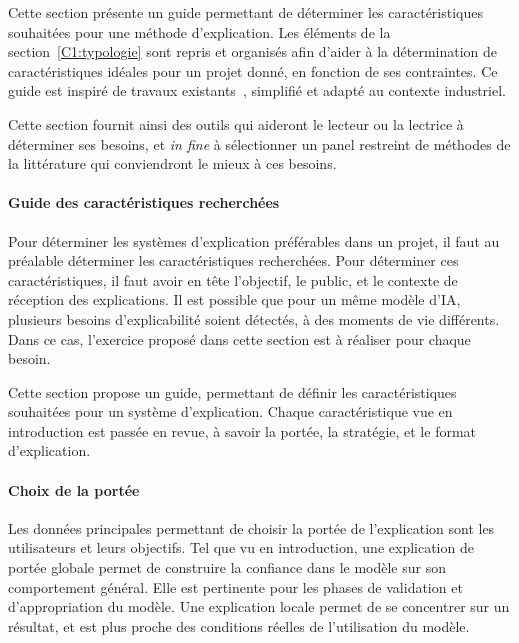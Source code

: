 Cette section présente un guide permettant de déterminer les caractéristiques souhaitées pour une méthode d'explication. Les éléments de la section~\ref{C1:typologie} sont repris et organisés afin d'aider à la détermination de caractéristiques idéales pour un projet donné, en fonction de ses contraintes. Ce guide est inspiré de travaux existants~\cite{Vermeire2021}, simplifié et adapté au contexte industriel.

Cette section fournit ainsi des outils qui aideront le lecteur ou la lectrice à déterminer ses besoins, et \textit{in fine} à sélectionner un panel restreint de méthodes de la littérature qui conviendront le mieux à ces besoins.


\paragraph{Guide des caractéristiques recherchées}
Pour déterminer les systèmes d'explication préférables dans un projet, il faut au préalable déterminer les caractéristiques recherchées.
Pour déterminer ces caractéristiques, il faut avoir en tête l'objectif, le public, et le contexte de réception des explications. Il est possible que pour un même modèle d'IA, plusieurs besoins d'explicabilité soient détectés, à des moments de vie différents.
Dans ce cas, l'exercice proposé dans cette section est à réaliser pour chaque besoin.

Cette section propose un guide, permettant de définir les caractéristiques souhaitées pour un système d'explication.
Chaque caractéristique vue en introduction est passée en revue, à savoir la portée, la stratégie, et le format d'explication.

\paragraph{Choix de la portée}
Les données principales permettant de choisir la portée de l'explication sont les utilisateurs et leurs objectifs.
Tel que vu en introduction, une explication de portée globale permet de construire la confiance dans le modèle sur son comportement général. Elle est pertinente pour les phases de validation et d'appropriation du modèle.
Une explication locale permet de se concentrer sur un résultat, et est plus proche des conditions réelles de l'utilisation du modèle.

